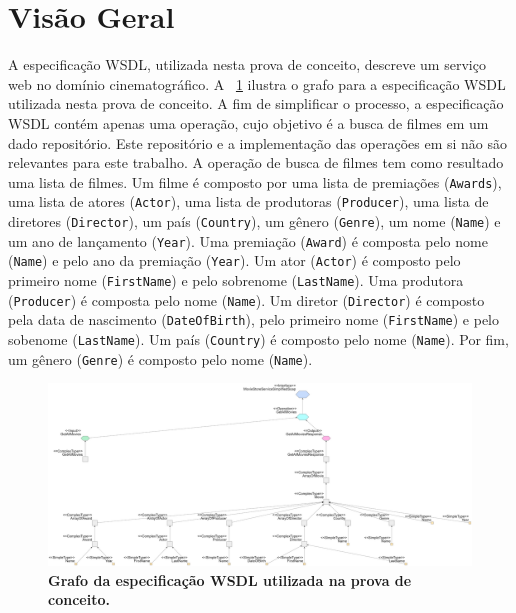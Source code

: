 \section{Visão Geral}\label{5-estudo-de-caso-visao-geral}

A especificação WSDL, utilizada nesta prova de conceito, descreve um serviço web no domínio cinematográfico. A \figurename~\ref{fig:estudo-de-caso-grafo-wsdl} ilustra o grafo para a especificação WSDL utilizada nesta prova de conceito. A fim de simplificar o processo, a especificação WSDL contém apenas uma operação, cujo objetivo é a busca de filmes em um dado repositório. Este repositório e a implementação das operações em si não são relevantes para este trabalho. A operação de busca de filmes tem como resultado uma lista de filmes. Um filme é composto por uma lista de premiações (\texttt{Awards}), uma lista de atores (\texttt{Actor}), uma lista de produtoras (\texttt{Producer}), uma lista de diretores (\texttt{Director}), um país (\texttt{Country}), um gênero (\texttt{Genre}), um nome (\texttt{Name}) e um ano de lançamento (\texttt{Year}). Uma premiação (\texttt{Award}) é composta pelo nome (\texttt{Name}) e pelo ano da premiação (\texttt{Year}). Um ator (\texttt{Actor}) é composto pelo primeiro nome (\texttt{FirstName}) e pelo sobrenome (\texttt{LastName}). Uma produtora (\texttt{Producer}) é composta pelo nome (\texttt{Name}). Um diretor (\texttt{Director}) é composto pela data de nascimento (\texttt{DateOfBirth}), pelo primeiro nome (\texttt{FirstName}) e pelo sobenome (\texttt{LastName}). Um país (\texttt{Country}) é composto pelo nome (\texttt{Name}). Por fim, um gênero (\texttt{Genre}) é composto pelo nome (\texttt{Name}).

\begin{landscape}
    \begin{figure}[h]
            \includegraphics[scale=0.65]{5-grasews-estudo-de-caso/imagens/estudo-de-caso-grafo-wsdl.png}
        \centering
        \caption[Grafo da especificação WSDL utilizada na prova de conceito]{\textbf{Grafo da especificação WSDL utilizada na prova de conceito.}}
        \label{fig:estudo-de-caso-grafo-wsdl}
    \end{figure}
\end{landscape}

